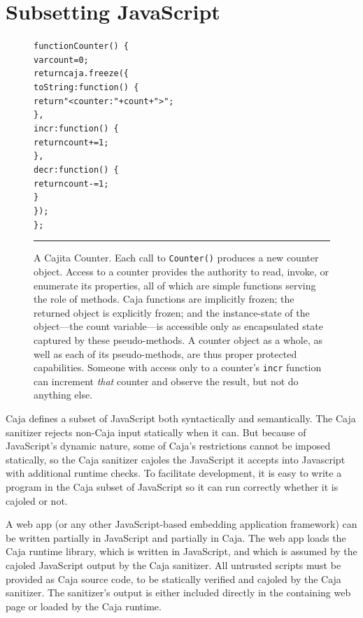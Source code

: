 \documentclass[letterpaper,twocolumn,10pt]{article}
\newcommand{\code}[1]{{\tt {#1}}}              %
\begin{document}
\section{Subsetting JavaScript}
\label{sec:subset}

\begin{figure}[t!]
\begin{alltt}
function Counter()\ \{
  var count = 0;
  return caja.freeze(\{
    toString: function()\ \{ 
      return "<counter: " + count + ">"; 
    \},
    incr: function()\ \{ 
      return count += 1; 
    \},
    decr: function()\ \{ 
      return count -= 1; 
    \}
  \});
\};
\end{alltt}

\caption[A Cajita Counter.]{A Cajita Counter. Each call to \code{Counter()} 
produces a new counter object. Access to a counter provides the authority to 
read, invoke, or enumerate its properties, all of which are simple functions 
serving the role of methods. Caja functions are implicitly frozen; the 
returned object is explicitly frozen; and the instance-state of the 
object---the count variable---is accessible only as encapsulated state 
captured by these pseudo-methods. A counter object as a whole, as well as 
each of its pseudo-methods, are thus proper protected capabilities. Someone 
with access only to a counter's \code{incr} function can increment 
\emph{that} counter and observe the result, but not do anything else.
 \\ } \hrule
\label{fig:cajita-counter}
\end{figure}

Caja defines a subset of JavaScript both syntactically and semantically. The 
Caja sanitizer rejects non-Caja input statically when it can. But because of 
JavaScript's dynamic nature, some of Caja's restrictions cannot be imposed 
statically, so the Caja sanitizer cajoles the JavaScript it accepts into 
Javascript with additional runtime checks. To facilitate development, it is 
easy to write a program in the Caja subset of JavaScript so it can run 
correctly whether it is cajoled or not.

A web app (or any other JavaScript-based embedding application framework) can 
be written partially in JavaScript and partially in Caja. The web app loads 
the Caja runtime library, which is written in JavaScript, and which is 
assumed by the cajoled JavaScript output by the Caja sanitizer. All 
untrusted scripts must be provided as Caja source code, to be statically 
verified and cajoled by the Caja sanitizer. The sanitizer's output is 
either included directly in the containing web page or loaded by the Caja 
runtime.
\end{document}

